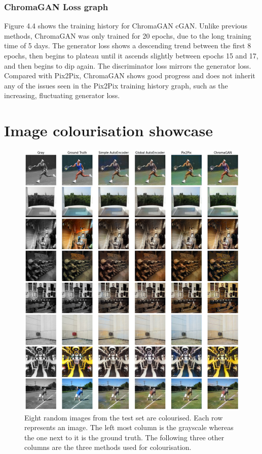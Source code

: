 \subsubsection*{ChromaGAN Loss graph}
Figure 4.4 shows the training history for ChromaGAN cGAN. Unlike previous methods, ChromaGAN was only trained for 20 epochs, due to the long training time of 5 days. The generator loss shows a descending trend between the first 8 epochs, then begins to plateau until it ascends slightly between epochs 15 and 17, and then begins to dip again. The discriminator loss mirrors the generator loss. Compared with Pix2Pix, ChromaGAN shows good progress and does not inherit any of the issues seen in the Pix2Pix training history graph, such as the increasing, fluctuating generator loss.








\section{Image colourisation showcase}
\begin{figure}[H]
    \centering
    \includegraphics[width=1\columnwidth]{sections/figures/colourisation.png}
    \caption{Eight random images from the test set are colourised. Each row represents an image. The left most column is the grayscale whereas the one next to it is the ground truth. The following three other columns are the three methods used for colourisation.}
    \label{fig:my_label}
\end{figure}



